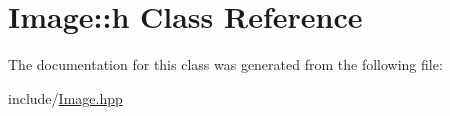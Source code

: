 \hypertarget{classImage_1_1h}{
\section{Image::h Class Reference}
\label{classImage_1_1h}
}


The documentation for this class was generated from the following file:\begin{DoxyCompactItemize}
\item 
include/\hyperlink{Image_8hpp}{Image.hpp}\end{DoxyCompactItemize}
